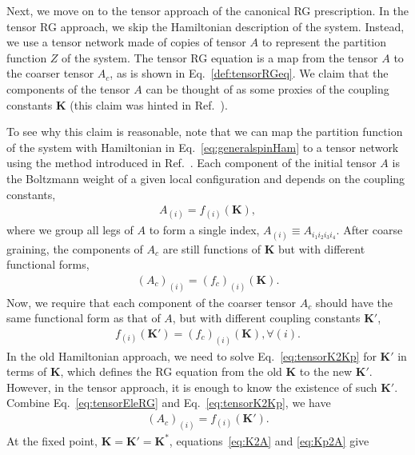\documentclass[aps,prr,reprint,superscriptaddress,nofootinbib,floatfix]{revtex4-2}
\begin{document}
Next, we move on to the tensor approach of the canonical RG prescription.
In the tensor RG approach, we skip the Hamiltonian description of the system. 
Instead, we use a tensor network made of copies of tensor $A$ to represent the partition function $Z$ of the system. 
The tensor RG equation is a map from the tensor $A$ to the coarser tensor $A_c$, as is shown in Eq.~\eqref{def:tensorRGeq}.
We claim that the components of the tensor $A$ can be thought of as some proxies of the coupling constants $\mathbf{K}$ (this claim was hinted in Ref.~\cite{GuWen2009}).
%

To see why this claim is reasonable, note that we can map the partition function of the system with Hamiltonian in Eq.~\eqref{eq:generalspinHam} to a tensor network using the method introduced in Ref.~\cite{trg}. 
Each component of the initial tensor $A$ is the Boltzmann weight of a given local configuration and depends on the coupling constants,
%
\begin{align}\label{eq:K2A}
    A_{(i)} = f_{(i)}\left(\mathbf{K}\right),
\end{align}
%
where we group all legs of $A$ to form a single index, $A_{(i)}\equiv A_{i_1 i_2 i_3 i_4}$. 
After coarse graining, the components of $A_c$ are still functions of $\mathbf{K}$ but
with different functional forms,
%
\begin{align}\label{eq:tensorEleRG}
    \left(A_c\right)_{(i)} =
\left(f_c\right)_{(i)}\left(\mathbf{K}\right).
\end{align}
%
Now, we require that each component of the coarser tensor $A_c$ should have the same functional form as that of $A$, but with different coupling constants $\mathbf{K}'$,
%
\begin{align}\label{eq:tensorK2Kp}
    f_{(i)}\left(\mathbf{K}'\right) =
    \left(f_c\right)_{(i)}\left(\mathbf{K}\right), \forall (i).
\end{align}
%
In the old Hamiltonian approach, we need to solve Eq.~\eqref{eq:tensorK2Kp} for $\mathbf{K}'$ in terms of $\mathbf{K}$, which defines the RG equation from the old $\mathbf{K}$ to the new $\mathbf{K}'$. 
However, in the tensor approach, it is enough to know the existence of such $\mathbf{K}'$. Combine Eq.~\eqref{eq:tensorEleRG} and Eq.~\eqref{eq:tensorK2Kp}, we have
%
\begin{align}\label{eq:Kp2A}
    \left(A_c\right)_{(i)} = f_{(i)}\left(\mathbf{K}'\right).
\end{align}
%
At the fixed point, $\mathbf{K} = \mathbf{K}' = \mathbf{K}^*$, equations~\eqref{eq:K2A} and \eqref{eq:Kp2A} give
\end{document}
